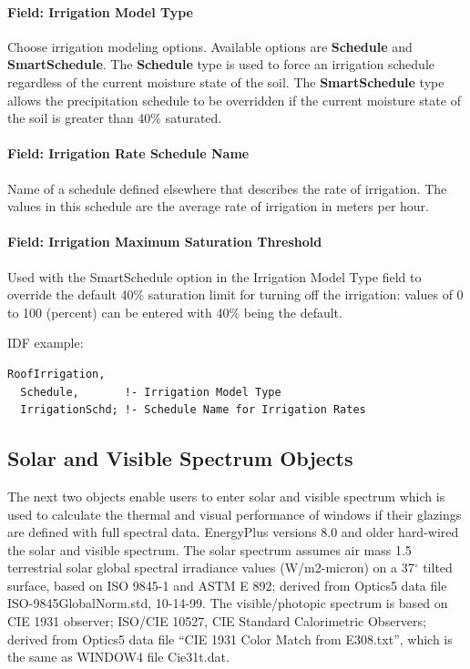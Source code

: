 \paragraph{Field: Irrigation Model Type}\label{field-irrigation-model-type}

Choose irrigation modeling options. Available options are \textbf{Schedule} and \textbf{SmartSchedule}. The \textbf{Schedule} type is used to force an irrigation schedule regardless of the current moisture state of the soil. The \textbf{SmartSchedule} type allows the precipitation schedule to be overridden if the current moisture state of the soil is greater than 40\% saturated.

\paragraph{Field: Irrigation Rate Schedule Name}\label{field-irrigation-rate-schedule-name}

Name of a schedule defined elsewhere that describes the rate of irrigation. The values in this schedule are the average rate of irrigation in meters per hour.

\paragraph{Field: Irrigation Maximum Saturation Threshold}\label{field-irrigation-maximum-saturation-threshold}

Used with the SmartSchedule option in the Irrigation Model Type field to override the default 40\% saturation limit for turning off the irrigation: values of 0 to 100 (percent) can be entered with 40\% being the default.

IDF example:

\begin{lstlisting}
RoofIrrigation,
  Schedule,       !- Irrigation Model Type
  IrrigationSchd; !- Schedule Name for Irrigation Rates
\end{lstlisting}

\subsection{Solar and Visible Spectrum Objects}\label{solar-and-visible-spectrum-objects}

The next two objects enable users to enter solar and visible spectrum which is used to calculate the thermal and visual performance of windows if their glazings are defined with full spectral data. EnergyPlus versions 8.0 and older hard-wired the solar and visible spectrum. The solar spectrum assumes air mass 1.5 terrestrial solar global spectral irradiance values (W/m2-micron) on a 37$^\circ$ tilted surface, based on ISO 9845-1 and ASTM E 892; derived from Optics5 data file ISO-9845GlobalNorm.std, 10-14-99. The visible/photopic spectrum is based on CIE 1931 observer; ISO/CIE 10527, CIE Standard Calorimetric Observers; derived from Optics5 data file ``CIE 1931 Color Match from E308.txt'', which is the same as WINDOW4 file Cie31t.dat.

